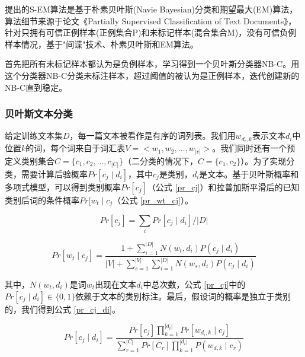
\citet{liu2002partially}提出的S-EM算法\cite{liu2002partially}是基于朴素贝叶斯(Navie Bayesian)分类和期望最大(EM)算法，算法细节来源于论文《Partially Supervised Classification of Text Documents》，针对只拥有可信正例样本(正例集合P)和未标记样本(混合集合M)，没有可信负例样本情况，基于"间谍"技术、朴素贝叶斯和EM算法。

首先把所有未标记样本都认为是负例样本，学习得到一个贝叶斯分类器NB-C。用这个分类器NB-C分类未标注样本，超过阈值的被认为是正例样本，迭代创建新的NB-C直到稳定。

\subsubsection{贝叶斯文本分类}

给定训练文本集$D$，每一篇文本被看作是有序的词列表。我们用$w_{d_i,k}$表示文本$d_i$中位置$k$的词，每个词来自于词汇表$V = < w_1,w_2,\ldots,w_{\left | v \right |}>$。我们同时还有一个预定义类别集合$C = \{ c_1,c_2,\ldots,c_{\left | C \right |} \}$（二分类的情况下，$C = \{c_1, c_2\}$）。为了实现分类，需要计算后验概率$Pr[c_j \mid
d_i]$，其中$c_j$是类别，$d_i$是文本。基于贝叶斯概率和多项式模型，可以得到类别概率$Pr[c_j]$（公式 \ref{pr_cj}）和拉普加斯平滑后的已知类别后词的条件概率$Pr[w_t \mid c_j$（公式 \ref{pr_wt_cj}）。

\begin{equation}
Pr\left [c_j \right ] = \sum\limits_iPr \left [ c_j \mid d_i \right ] / \left | D \right |
\label{pr_cj}
\end{equation}

\begin{equation}
Pr\left [w_t \mid c_j \right ] = \frac{1 + \sum\limits_{i=1}^{\left | D \right |}N(w_t,d_i)P(c_j \mid d_i)}{\left | V \right | + \sum\limits_{s=1}^{\left | V \right |}{\sum\limits_{i=1}^{\left | D \right |}N(w_s,d_i)P(c_j \mid d_i)}}
\label{pr_wt_cj}
\end{equation}

其中，$N(w_t, d_i)$是词$w_t$出现在文本$d_i$中总次数，公式 \ref{pr_cj}中的$Pr[c_j \mid d_i] \in \{0,1\}$依赖于文本的类别标注。最后，假设词的概率是独立于类别的，我们得到公式 \ref{pr_cj_di}。

\begin{equation}
Pr\left [ c_j \mid d_i \right ] = \frac{Pr \left [ c_j \right]\prod\limits_{k=1}^{\left | d_i \right |}Pr \left [ w_{d_i,k} \mid c_j\right ]}{\sum\limits_{r=1}^{\left | C \right |} Pr \left [ C_r \right ]\prod\limits_{k=1}^{\left | d_i \right |} P(w_{d,k} \mid c_r)}
\label{pr_cj_di}
\end{equation}

